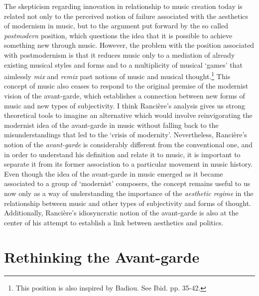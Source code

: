 The skepticism regarding innovation in relationship to music creation today is related not only to the perceived notion of failure associated with the aesthetics of modernism in music, but to the argument put forward by the so called \emph{postmodern} position, which questions the idea that it is possible to achieve something new through music. However, the problem with the position associated with postmodernism is that it reduces music only to a mediation of already existing musical styles and forms and to a multiplicity of musical `games' that aimlessly \emph{mix} and \emph{remix} past notions of music and musical thought.\footnote{This position is also inspired by Badiou. See Ibid. pp. 35-42.} This concept of music also ceases to respond to the original premise of the modernist vision of the avant-garde, which establishes a connection between new forms of music and new types of subjectivity. I think Ranci\`{e}re's analysis gives us strong theoretical tools to imagine an alternative which would involve reinvigorating the modernist idea of the avant-garde in music without falling back to the misunderstandings that led to the `crisis of modernity'. Nevertheless, Ranci\`{e}re's notion of the \emph{avant-garde} is considerably different from the conventional one, and in order to understand his definition and relate it to music, it is important to separate it from its former association to a particular movement in music history. Even though the idea of the avant-garde in music emerged as it became associated to a group of `modernist' composers, the concept remains useful to us now only as a way of understanding the importance of the \emph{aesthetic regime} in the relationship between music and other types of subjectivity and forms of thought. Additionally, Ranci\`{e}re's idiosyncratic notion of the avant-garde is also at the center of his attempt to establish a link between aesthetics and politics. 

\hypertarget{rethinkavant}{}
\section{Rethinking the Avant-garde}

